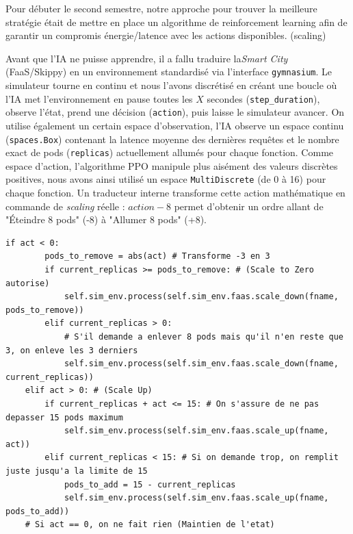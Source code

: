 Pour débuter le second semestre, notre approche pour trouver la meilleure stratégie était de mettre en place un algorithme de reinforcement learning afin de garantir un compromis énergie/latence avec les actions disponibles. (scaling) 

Avant que l'IA ne puisse apprendre, il a fallu traduire la\textit{Smart City} (FaaS/Skippy) en un environnement standardisé via l'interface \texttt{gymnasium}.
Le simulateur tourne en continu et nous l'avons discrétisé en créant une boucle où l'IA met l'environnement en pause toutes les $X$ secondes (\texttt{step\_duration}), observe l'état, prend une décision (\texttt{action}), puis laisse le simulateur avancer.
On utilise également un certain espace d'observation, l'IA observe un espace continu (\texttt{spaces.Box}) contenant la latence moyenne des dernières requêtes et le nombre exact de pods (\texttt{replicas}) actuellement allumés pour chaque fonction.
Comme espace d'action, l'algorithme PPO manipule plus aisément des valeurs discrètes positives, nous avons ainsi utilisé un espace \texttt{MultiDiscrete} (de 0 à 16) pour chaque fonction. Un traducteur interne transforme cette action mathématique en commande de \textit{scaling} réelle : $action - 8$ permet d'obtenir un ordre allant de "Éteindre 8 pods" (-8) à "Allumer 8 pods" (+8).

\begin{lstlisting}[caption= Différentes actions possibles pour chaque step]
    if act < 0:
        pods_to_remove = abs(act) # Transforme -3 en 3            
        if current_replicas >= pods_to_remove: # (Scale to Zero autorise)
            self.sim_env.process(self.sim_env.faas.scale_down(fname, pods_to_remove))
        elif current_replicas > 0:
            # S'il demande a enlever 8 pods mais qu'il n'en reste que 3, on enleve les 3 derniers
            self.sim_env.process(self.sim_env.faas.scale_down(fname, current_replicas))
    elif act > 0: # (Scale Up) 
        if current_replicas + act <= 15: # On s'assure de ne pas depasser 15 pods maximum
            self.sim_env.process(self.sim_env.faas.scale_up(fname, act))
        elif current_replicas < 15: # Si on demande trop, on remplit juste jusqu'a la limite de 15
            pods_to_add = 15 - current_replicas
            self.sim_env.process(self.sim_env.faas.scale_up(fname, pods_to_add))
    # Si act == 0, on ne fait rien (Maintien de l'etat)
\end{lstlisting}

